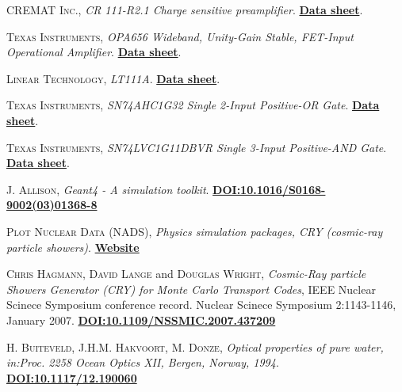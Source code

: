 \begin{thebibliography}{100}
 \textsc{CREMAT Inc.},
\textit{CR 111-R2.1 Charge sensitive preamplifier}. \href{https://www.cremat.com/home/charge-sensitive-preamplifiers/}{\textbf{Data sheet}}.

 \textsc{Texas Instruments},
\textit{OPA656 Wideband, Unity-Gain Stable, FET-Input Operational Amplifier}. \href{https://www.ti.com/product/OPA656}{\textbf{Data sheet}}.

 \textsc{Linear Technology},
\textit{LT111A}. \href{https://datasheetspdf.com/pdf/57354/LinearTechnology/LT111/1}{\textbf{Data sheet}}.

 \textsc{Texas Instruments},
\textit{SN74AHC1G32 Single 2-Input Positive-OR Gate}. \href{https://www.ti.com/product/SN74AHC1G32}{\textbf{Data sheet}}.

 \textsc{Texas Instruments},
\textit{SN74LVC1G11DBVR Single 3-Input Positive-AND Gate}. \href{https://www.ti.com/store/ti/en/p/product/?p=SN74LVC1G11DBVR}{\textbf{Data sheet}}.


 \textsc{J. Allison}, 
\textit{Geant4 - A simulation toolkit}. \href{https://doi.org/10.1016/S0168-9002(03)01368-8}{\textbf{DOI:10.1016/S0168-9002(03)01368-8}}

 \textsc{Plot Nuclear Data (NADS)}, 
\textit{Physics simulation packages, CRY (cosmic-ray particle showers)}. \href{https://nuclear.llnl.gov/simulation/}{\textbf{Website}}

 \textsc{Chris Hagmann}, \textsc{David Lange} and \textsc{Douglas Wright}, 
\textit{Cosmic-Ray particle Showers Generator (CRY) for Monte Carlo Transport Codes}, IEEE Nuclear Scinece Symposium conference record. Nuclear Scinece Symposium 2:1143-1146, January 2007. \href{https://www.researchgate.net/publication/4313740_Cosmic-ray_shower_generator_CRY_for_Monte_Carlo_transport_codes}{\textbf{DOI:10.1109/NSSMIC.2007.437209}}

 \textsc{H. Buiteveld}, \textsc{J.H.M. Hakvoort}, \textsc{M. Donze}, 
\textit{Optical properties of pure water, in:Proc. 2258 Ocean Optics XII, Bergen, Norway, 1994}. \href{https://www.spiedigitallibrary.org/conference-proceedings-of-spie/2258/1/Optical-properties-of-pure-water/10.1117/12.190060.short?SSO=1}{\textbf{DOI:10.1117/12.190060}}


\end{thebibliography}
